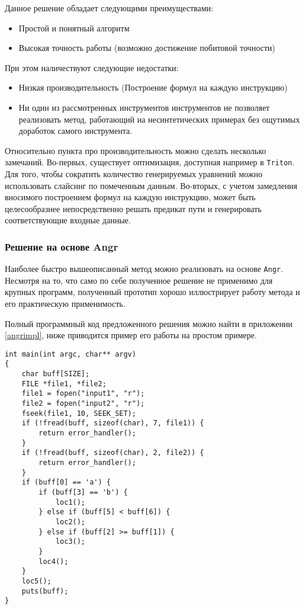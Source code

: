 Данное решение обладает следующими преимуществами:
  \begin{itemize}
    \item Простой и понятный алгоритм
    \item Высокая точность работы (возможно достижение побитовой точности)
  \end{itemize}

При этом наличествуют следующие недостатки:
\begin{itemize}
  \item Низкая производительность (Построение формул на каждую инструкцию)
  \item Ни один из рассмотренных инструментов инструментов не позволяет реализовать метод, работающий на несинтетических примерах без ощутимых доработок самого инструмента.
\end{itemize}

Относительно пункта про производительность можно сделать несколько замечаний.
Во-первых, существует оптимизация, доступная например в \texttt{Triton}. Для того, чтобы сократить количество генерируемых уравнений можно использовать слайсинг по помеченным данным.
Во-вторых, с учетом замедления вносимого построением формул на каждую инструкцию, может быть целесообразнее непосредственно решать предикат пути и генерировать соответствующие входные данные.

\subsubsection{Решение на основе Angr}

Наиболее быстро вышеописанный метод можно реализовать на основе \texttt{Angr}. Несмотря на то, что само по себе полученное решение не применимо для крупных программ, полученный прототип хорошо иллюстрирует работу метода и его практическую применимость.

Полный программный код предложенного решения можно найти в приложении \ref{angrimpl}, ниже приводится пример его работы на простом примере.

\begin{lstlisting}[environoment=C_LANG, caption=jumper.c, label={lst:jumper}, captionpos=b]
int main(int argc, char** argv)
{
    char buff[SIZE];
    FILE *file1, *file2;
    file1 = fopen("input1", "r");
    file2 = fopen("input2", "r");
    fseek(file1, 10, SEEK_SET);
    if (!fread(buff, sizeof(char), 7, file1)) {
        return error_handler();
    }
    if (!fread(buff, sizeof(char), 2, file2)) {
        return error_handler();
    }
    if (buff[0] == 'a') {
        if (buff[3] == 'b') {
            loc1();
        } else if (buff[5] < buff[6]) {
            loc2();
        } else if (buff[2] >= buff[1]) {
            loc3();
        }
        loc4();
    }
    loc5();
    puts(buff);
}
\end{lstlisting}


